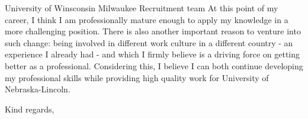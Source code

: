 \documentclass[11pt]{letter}
\begin{document}
\begin{letter}{University of Winsconsin Milwaukee Recruitment team}
  At this point of my career, I think I am professionally mature enough to apply my knowledge in a more
  challenging position. There is also another important reason to venture into such change: being involved in different
  work culture in a different country - an experience I already had - and which I firmly believe is a driving force
  on getting better as a professional.
  Considering this, I believe I can both continue developing my professional skills while providing high quality work
  for University of Nebraska-Lincoln.
  
  \closing{Kind regards,}

  
\end{letter}
\end{document}
